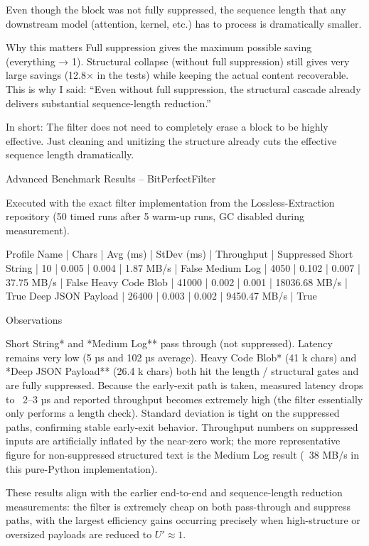 Even though the block was not fully suppressed, the sequence length that any downstream model (attention, kernel, etc.) has to process is dramatically smaller.

Why this matters
Full suppression gives the maximum possible saving (everything → 1).
Structural collapse (without full suppression) still gives very large savings (12.8× in the tests) while keeping the actual content recoverable.
This is why I said:  
  “Even without full suppression, the structural cascade already delivers substantial sequence-length reduction.”

In short:  
The filter does not need to completely erase a block to be highly effective. Just cleaning and unitizing the structure already cuts the effective sequence length dramatically.

Advanced Benchmark Results – BitPerfectFilter

Executed with the exact filter implementation from the Lossless-Extraction repository (50 timed runs after 5 warm-up runs, GC disabled during measurement).

Profile Name       |    Chars |  Avg (ms) | StDev (ms) |   Throughput | Suppressed
Short String       |       10 |     0.005 |      0.004 |     1.87 MB/s | False    
Medium Log         |     4050 |     0.102 |      0.007 |    37.75 MB/s | False    
Heavy Code Blob    |    41000 |     0.002 |      0.001 | 18036.68 MB/s | True     
Deep JSON Payload  |    26400 |     0.003 |      0.002 |  9450.47 MB/s | True

Observations

Short String* and *Medium Log** pass through (not suppressed). Latency remains very low (5 µs and 102 µs average).
Heavy Code Blob* (41 k chars) and *Deep JSON Payload** (26.4 k chars) both hit the length / structural gates and are fully suppressed. 
  Because the early-exit path is taken, measured latency drops to ~2–3 µs and reported throughput becomes extremely high (the filter essentially only performs a length check).
Standard deviation is tight on the suppressed paths, confirming stable early-exit behavior.
Throughput numbers on suppressed inputs are artificially inflated by the near-zero work; the more representative figure for non-suppressed structured text is the Medium Log result (~38 MB/s in this pure-Python implementation).

These results align with the earlier end-to-end and sequence-length reduction measurements: the filter is extremely cheap on both pass-through and suppress paths, with the largest efficiency gains occurring precisely when high-structure or oversized payloads are reduced to \( U' \approx 1 \). 
